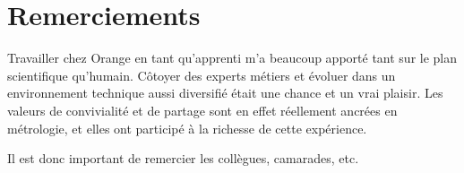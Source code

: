 \chapter*{Remerciements}

Travailler chez Orange en tant qu’apprenti m’a beaucoup apporté tant sur le plan scientifique qu'humain. Côtoyer des experts métiers et évoluer dans un environnement technique aussi diversifié était une chance et un vrai plaisir. Les valeurs de convivialité et de partage sont en effet réellement ancrées en métrologie, et elles ont participé à la richesse de cette expérience.

Il est donc important de remercier les collègues, camarades, etc.
\lipsum[3-5]
